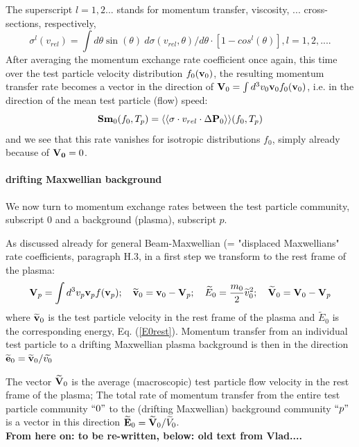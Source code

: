 \documentclass[12pt,dvipdfmx]{article}
\begin{document}
The superscript $l=1,2...$ stands for momentum transfer, viscosity,
... cross-sections, respectively,
\begin{equation}
\sigma^l(v_{rel}) = \int d\theta \sin(\theta) \ d\sigma(v_{rel},\theta)/d\theta \cdot [1-cos^l(\theta)], l=1,2,....
\end{equation}
After averaging the momentum exchange rate coefficient once again, this time over the test particle velocity distribution $f_0({\bf v}_0)$, the resulting momentum transfer rate
becomes a vector in the direction of ${\bf V}_0 = \int d^3v_0 {\bf v}_0f_0({\bf v}_0)$, i.e. in the direction of the mean test particle (flow) speed:
\begin{equation}
{\bf Sm}_0(f_0,T_p) =\langle\langle \sigma\cdot v_{rel}\cdot \Delta {\bf P}_0\rangle\rangle(f_0,T_p)
\end{equation}
and we see that this rate vanishes for isotropic distributions $f_0$, simply already because of ${\bf V_0} = 0$.
\\
\paragraph{drifting Maxwellian background}
We now turn to momentum exchange rates between the test particle community, subscript $0$ and a background (plasma), subscript $p$.

As discussed already for general Beam-Maxwellian (= "displaced Maxwellians" rate coefficients,
paragraph H.3, in a first step we transform to the rest frame of the plasma:
\begin{equation}
{\bf V}_p=\int d^3v_p {\bf v}_p f({\bf v}_p) ;  \quad   \widetilde{{\bf v}}_0= {\bf v}_0 - {\bf V}_p
; \quad \widetilde{E}_0=\frac{m_0}{2} \widetilde{v}_0^2
;  \quad   \widetilde{{\bf V}}_0= {\bf V}_0 - {\bf V}_p
\end{equation}
where $\widetilde{{\bf v}}_0$ is the test particle velocity in the rest frame
of the plasma and  $\widetilde{E}_0$ is the corresponding energy, Eq. (\ref{E0rest}).
Momentum transfer from an individual test particle to a drifting Maxwellian plasma background is then in the direction $\widetilde{{\bf e}}_0=\widetilde{{\bf v}}_0/\widetilde{v_0}$

The vector $\widetilde{{\bf V}}_0$ is the average (macroscopic) test particle flow velocity in the rest frame of the plasma;
The total rate of momentum transfer from the entire test particle community $``0"$ to the (drifting Maxwellian) background community $``p"$
is a vector in this direction  $\widetilde{{\bf E}}_0 = \widetilde{{\bf V}}_0/\widetilde{V}_0$.\\
\textcolor[rgb]{1.00,0.00,0.00}{\textbf{From here on: to be re-written, below: old text from Vlad....}}
\end{document}
